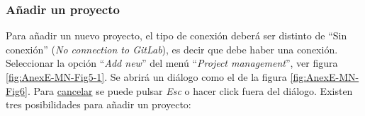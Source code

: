 \subsubsection{Añadir un proyecto}
Para añadir un nuevo proyecto, el tipo de conexión deberá ser distinto de ``Sin conexión'' (\textit{No connection to GitLab}), es decir que debe haber una conexión. Seleccionar la opción ``\textit{Add new}'' del menú ``\textit{Project management}'', ver figura \ref{fig:AnexE-MN-Fig5-1}. Se abrirá un diálogo como el de la figura \ref{fig:AnexE-MN-Fig6}. Para \underline{cancelar} se puede pulsar \textit{Esc} o hacer click fuera del diálogo.
Existen tres posibilidades para añadir un proyecto:
